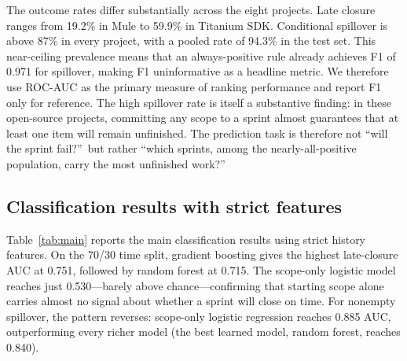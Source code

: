 \documentclass[conference]{IEEEtran}
\begin{document}
The outcome rates differ substantially across the eight projects.
Late closure ranges from 19.2\% in Mule to 59.9\% in Titanium SDK.
Conditional spillover is above 87\% in every project, with a pooled rate of 94.3\% in the test set.
This near-ceiling prevalence means that an always-positive rule already achieves F1 of 0.971 for spillover, making F1 uninformative as a headline metric.
We therefore use ROC-AUC as the primary measure of ranking performance and report F1 only for reference.
The high spillover rate is itself a substantive finding: in these open-source projects, committing any scope to a sprint almost guarantees that at least one item will remain unfinished.
The prediction task is therefore not ``will the sprint fail?''\ but rather ``which sprints, among the nearly-all-positive population, carry the most unfinished work?''

\subsection{Classification results with strict features}

Table~\ref{tab:main} reports the main classification results using strict history features.
On the 70/30 time split, gradient boosting gives the highest late-closure AUC at 0.751, followed by random forest at 0.715.
The scope-only logistic model reaches just 0.530---barely above chance---confirming that starting scope alone carries almost no signal about whether a sprint will close on time.
For nonempty spillover, the pattern reverses: scope-only logistic regression reaches 0.885 AUC, outperforming every richer model (the best learned model, random forest, reaches 0.840).
\end{document}
